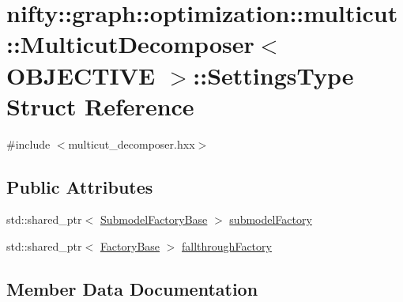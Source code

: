 \hypertarget{structnifty_1_1graph_1_1optimization_1_1multicut_1_1MulticutDecomposer_1_1SettingsType}{}\section{nifty\+:\+:graph\+:\+:optimization\+:\+:multicut\+:\+:Multicut\+Decomposer$<$ O\+B\+J\+E\+C\+T\+I\+V\+E $>$\+:\+:Settings\+Type Struct Reference}
\label{structnifty_1_1graph_1_1optimization_1_1multicut_1_1MulticutDecomposer_1_1SettingsType}


{\ttfamily \#include $<$multicut\+\_\+decomposer.\+hxx$>$}

\subsection*{Public Attributes}
\begin{DoxyCompactItemize}
\item 
std\+::shared\+\_\+ptr$<$ \hyperlink{classnifty_1_1graph_1_1optimization_1_1multicut_1_1MulticutDecomposer_ad0cfefa227a0ab22508cda89dd3a4320}{Submodel\+Factory\+Base} $>$ \hyperlink{structnifty_1_1graph_1_1optimization_1_1multicut_1_1MulticutDecomposer_1_1SettingsType_ae81a9cbe54a40113c9d053895c361235}{submodel\+Factory}
\item 
std\+::shared\+\_\+ptr$<$ \hyperlink{classnifty_1_1graph_1_1optimization_1_1multicut_1_1MulticutDecomposer_abe39b7b32f6d3b6f01d24e0d298f759a}{Factory\+Base} $>$ \hyperlink{structnifty_1_1graph_1_1optimization_1_1multicut_1_1MulticutDecomposer_1_1SettingsType_a718df2feaec8752e14fa403737eb2bc4}{fallthrough\+Factory}
\end{DoxyCompactItemize}


\subsection{Member Data Documentation}
\hypertarget{structnifty_1_1graph_1_1optimization_1_1multicut_1_1MulticutDecomposer_1_1SettingsType_a718df2feaec8752e14fa403737eb2bc4}{}
